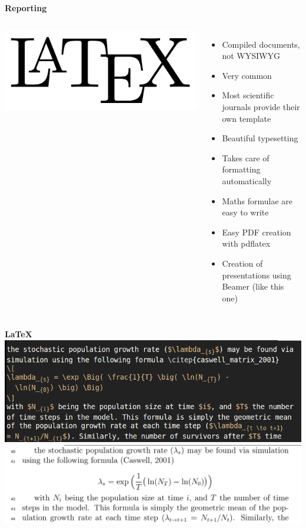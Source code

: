\documentclass[9pt,xcolor=pdftex,dvipsnames,table]{beamer}
\begin{document}
\begin{frame}{\textbf{Reporting}}
\begin{columns}
\centering
\includegraphics[width=1\textwidth]{images/LaTeX-logo.png}
\begin{itemize}
\item Compiled documents, not WYSIWYG
\item Very common
\item Most scientific journals provide their own template
\item Beautiful typesetting
\item Takes care of formatting automatically
\item Maths formulae are easy to write
\item Easy PDF creation with pdflatex
\item Creation of presentations using Beamer (like this one)
\end{itemize}
\end{columns}
\end{frame}


\begin{frame}{\textbf{\LaTeX}}
\centering
\includegraphics[width=.8\textwidth]{images/latex-ex.png} \\
\vspace{.5cm}
\includegraphics[width=1\textwidth]{images/latex-ex-pdf.png}
\end{frame}
\end{document}
